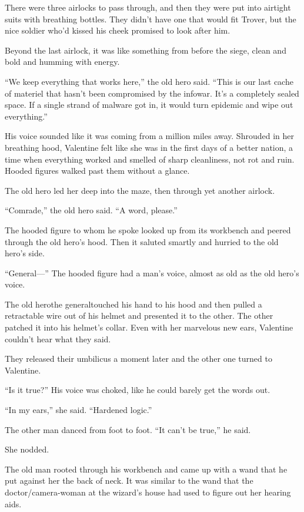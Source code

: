 There were three airlocks to pass through, and then they were put
into airtight suits with breathing bottles. They didn’t have one
that would fit Trover, but the nice soldier who’d kissed his cheek
promised to look after him.

Beyond the last airlock, it was like something from before the
siege, clean and bold and humming with energy.

“We keep everything that works here,” the old hero said. “This is
our last cache of materiel that hasn’t been compromised by the
infowar. It’s a completely sealed space. If a single strand of
malware got in, it would turn epidemic and wipe out everything.”

His voice sounded like it was coming from a million miles away.
Shrouded in her breathing hood, Valentine felt like she was in the
first days of a better nation, a time when everything worked and
smelled of sharp cleanliness, not rot and ruin. Hooded figures
walked past them without a glance.

The old hero led her deep into the maze, then through yet another
airlock.

“Comrade,” the old hero said. “A word, please.”

The hooded figure to whom he spoke looked up from its workbench and
peered through the old hero’s hood. Then it saluted smartly and
hurried to the old hero’s side.

“General---” The hooded figure had a man’s voice, almost as old as
the old hero’s voice.

The old hero\dash{}the general\dash{}touched his hand to his hood and then
pulled a retractable wire out of his helmet and presented it to the
other. The other patched it into his helmet’s collar. Even with her
marvelous new ears, Valentine couldn’t hear what they said.

They released their umbilicus a moment later and the other one
turned to Valentine.

“Is it true?” His voice was choked, like he could barely get the
words out.

“In my ears,” she said. “Hardened logic.”

The other man danced from foot to foot. “It can’t be true,” he
said.

She nodded.

The old man rooted through his workbench and came up with a wand
that he put against her the back of neck. It was similar to the
wand that the doctor/camera-woman at the wizard’s house had used to
figure out her hearing aids.

